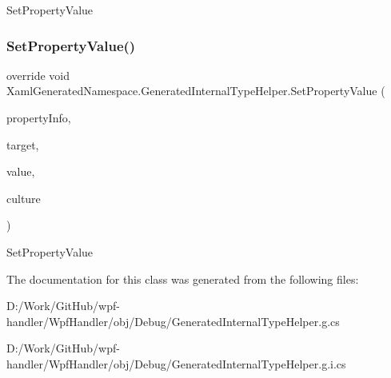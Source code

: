Set\+Property\+Value 

\mbox{\label{class_xaml_generated_namespace_1_1_generated_internal_type_helper_ade0f04c0f7b18dd5b170e071d5534d38}} 
\subsubsection{\texorpdfstring{Set\+Property\+Value()}{SetPropertyValue()}\hspace{0.1cm}{\footnotesize\ttfamily [4/4]}}
{\footnotesize\ttfamily override void Xaml\+Generated\+Namespace.\+Generated\+Internal\+Type\+Helper.\+Set\+Property\+Value (\begin{DoxyParamCaption}\item[{System.\+Reflection.\+Property\+Info}]{property\+Info,  }\item[{object}]{target,  }\item[{object}]{value,  }\item[{System.\+Globalization.\+Culture\+Info}]{culture }\end{DoxyParamCaption})\hspace{0.3cm}{\ttfamily [protected]}}



Set\+Property\+Value 



The documentation for this class was generated from the following files\+:\begin{DoxyCompactItemize}
\item 
D\+:/\+Work/\+Git\+Hub/wpf-\/handler/\+Wpf\+Handler/obj/\+Debug/Generated\+Internal\+Type\+Helper.\+g.\+cs\item 
D\+:/\+Work/\+Git\+Hub/wpf-\/handler/\+Wpf\+Handler/obj/\+Debug/Generated\+Internal\+Type\+Helper.\+g.\+i.\+cs\end{DoxyCompactItemize}
